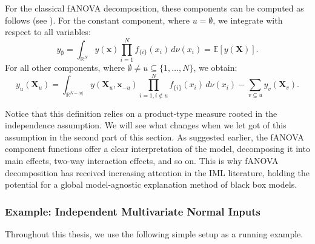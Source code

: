 For the classical fANOVA decomposition, these components can be computed as 
follows (see \cite{rahman2014}).
For the constant component, where $u = \emptyset$, we integrate with respect 
to all variables:
\begin{equation}
    y_{\emptyset} 
    = \int_{\mathbb{R}^N} 
        y(\boldsymbol{x}) 
        \prod_{i=1}^{N} f_{\{i\}}(x_i) 
        \, d\nu (x_i) 
    = \mathbb{E}[y(\boldsymbol{X})].
    \label{eq:intercept_classical}
\end{equation}
For all other components, where $\emptyset \neq u \subseteq \{1, \dots, N\}$, we obtain:
\begin{equation}
    y_u(\boldsymbol{X}_u) 
    = \int_{\mathbb{R}^{N- |u|}} 
        y(\boldsymbol{X}_u, \boldsymbol{x}_{-u}) 
        \prod_{i=1, i \notin u}^{N} f_{\{i\}}(x_i) 
        \, d\nu (x_i) 
      - \sum_{v \subsetneq u} y_v(\boldsymbol{X}_v).
    \label{eq:fanova_components_classical}
\end{equation}

Notice that this definition relies on a product-type measure rooted in the independence assumption. We will see what changes when we let got of this assumption in the second part of this section.
As suggested earlier, the fANOVA component functions offer a clear interpretation of the model, decomposing it into main effects, two-way interaction effects, and so on. This is why fANOVA decomposition has received increasing attention in the IML literature, holding the potential for a global model-agnostic explanation method of black box models.
\subsubsection{Example: Independent Multivariate Normal Inputs}

Throughout this thesis, we use the following simple setup as a running example.

